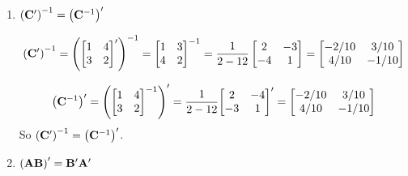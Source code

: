 \begin{enumerate}[font=\bfseries]
\begin{enumerate}
            \item ${\left(\bold{C}^\prime\right)}^{-1} = {\left(\bold{C}^{-1}\right)}^\prime$
            

            \[
                {\left(\bold{C}^\prime\right)}^{-1} = 
                {\left(
                    {\begin{bmatrix}
                        1 & 4 \\
                        3 & 2
                    \end{bmatrix}}^\prime\right)
                }^{-1} =
                {\begin{bmatrix}
                        1 & 3 \\
                        4 & 2
                \end{bmatrix}}^{-1} =
                \frac{1}{2-12}
                \begin{bmatrix}
                    2 & -3 \\
                    -4 & 1
                \end{bmatrix} =
                \begin{bmatrix}
                    -2/10 & 3/10 \\
                    4/10 & -1/10
                \end{bmatrix}
            \]

            \[
                {\left(\bold{C}^{-1}\right)}^\prime =
                {\left(
                    {\begin{bmatrix}
                        1 & 4 \\
                        3 & 2
                    \end{bmatrix}}^{-1}\right)
                }^\prime =
                {\frac{1}{2-12}
                {\begin{bmatrix}
                    2 & -4 \\
                    -3 & 1
                \end{bmatrix}}
                }^\prime =
                \begin{bmatrix}
                    -2/10 & 3/10 \\
                    4/10 & -1/10
                \end{bmatrix}
            \]
            So ${\left(\bold{C}^\prime\right)}^{-1} = {\left(\bold{C}^{-1}\right)}^\prime$.

            \item ${\left(\bold{AB}\right)}^\prime = \bold{B}^\prime \bold{A}^\prime$
            

\end{enumerate}
\end{enumerate}
